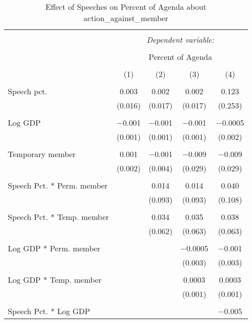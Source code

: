 
\begin{table}[!htbp] \centering 
  \caption{Effect of Speeches on Percent of Agenda about  action_against_member} 
  \label{} 
\begin{tabular}{@{\extracolsep{5pt}}lcccc} 
\\[-1.8ex]\hline 
\hline \\[-1.8ex] 
 & \multicolumn{4}{c}{\textit{Dependent variable:}} \\ 
\cline{2-5} 
\\[-1.8ex] & \multicolumn{4}{c}{Percent of Agenda} \\ 
\\[-1.8ex] & (1) & (2) & (3) & (4)\\ 
\hline \\[-1.8ex] 
 Speech pct. & 0.003 & 0.002 & 0.002 & 0.123 \\ 
  & (0.016) & (0.017) & (0.017) & (0.253) \\ 
  & & & & \\ 
 Log GDP & $-$0.001 & $-$0.001 & $-$0.001 & $-$0.0005 \\ 
  & (0.001) & (0.001) & (0.001) & (0.002) \\ 
  & & & & \\ 
 Temporary member & 0.001 & $-$0.001 & $-$0.009 & $-$0.009 \\ 
  & (0.002) & (0.004) & (0.029) & (0.029) \\ 
  & & & & \\ 
 Speech Pct. * Perm. member &  & 0.014 & 0.014 & 0.040 \\ 
  &  & (0.093) & (0.093) & (0.108) \\ 
  & & & & \\ 
 Speech Pct. * Temp. member &  & 0.034 & 0.035 & 0.038 \\ 
  &  & (0.062) & (0.063) & (0.063) \\ 
  & & & & \\ 
 Log GDP * Perm. member &  &  & $-$0.0005 & $-$0.001 \\ 
  &  &  & (0.003) & (0.003) \\ 
  & & & & \\ 
 Log GDP * Temp. member &  &  & 0.0003 & 0.0003 \\ 
  &  &  & (0.001) & (0.001) \\ 
  & & & & \\ 
 Speech Pct. * Log GDP &  &  &  & $-$0.005 \\ 

\end{tabular}
\end{table}
